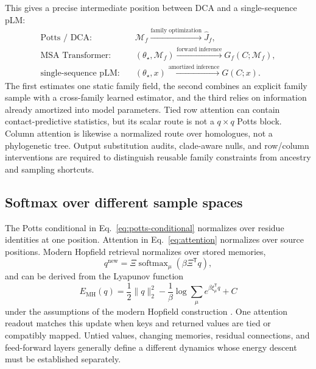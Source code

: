 \documentclass[10pt]{article}
\theoremstyle{definition}
\theoremstyle{remark}
\newcommand{\BookSection}[1]{\subsection{#1}}
\begin{document}
This gives a precise intermediate position between DCA and a single-sequence pLM:
\begin{equation}
\begin{aligned}
\text{Potts / DCA:}&\quad
\mathcal M_f\xrightarrow{\text{family optimization}}\widehat J_f,\\
\text{MSA Transformer:}&\quad
(\theta_\star,\mathcal M_f)\xrightarrow{\text{forward inference}}
G_f(C;\mathcal M_f),\\
\text{single-sequence pLM:}&\quad
(\theta_\star,x)\xrightarrow{\text{amortized inference}}G(C;x).
\end{aligned}
\label{eq:three-family-inference-regimes}
\end{equation}
The first estimates one static family field, the second combines an explicit family sample with a
cross-family learned estimator, and the third relies on information already amortized into model
parameters.  Tied row attention can contain contact-predictive statistics, but its scalar route is
not a $q\times q$ Potts block.  Column attention is likewise a normalized route over homologues, not
a phylogenetic tree.  Output substitution audits, clade-aware nulls, and row/column interventions
are required to distinguish reusable family constraints from ancestry and sampling shortcuts.

\BookSection{Softmax over different sample spaces}

The Potts conditional in Eq.~\ref{eq:potts-conditional} normalizes over residue identities at one
position.  Attention in Eq.~\ref{eq:attention} normalizes over source positions.  Modern Hopfield
retrieval normalizes over stored memories,
\begin{equation}
q^{\mathrm{new}}
=\Xi\operatorname{softmax}_{\mu}(\beta\Xi^{\mathsf T}q),
\label{eq:modern-hopfield-update}
\end{equation}
and can be derived from the Lyapunov function
\begin{equation}
E_{\mathrm{MH}}(q)
=\frac12\|q\|_2^2
-\frac1\beta\log\sum_\mu e^{\beta\xi_\mu^{\mathsf T}q}+C
\label{eq:modern-hopfield-energy}
\end{equation}
under the assumptions of the modern Hopfield construction \cite{ramsauer2021}.  One attention
readout matches this update when keys and returned values are tied or compatibly mapped.  Untied
values, changing memories, residual connections, and feed-forward layers generally define a
different dynamics whose energy descent must be established separately.
\end{document}
